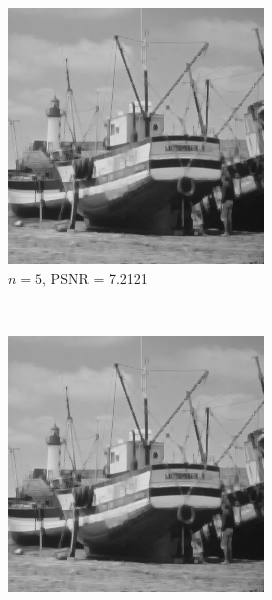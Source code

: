 \documentclass{article}
\begin{document}
\begin{enumerate}[label=(\alph*)]
\begin{figure}[!htb]
        \begin{subfigure}[b]{0.3\textwidth}
            \includegraphics[width=\textwidth]{img/RSC5.png}
            \caption{$n = 5$, PSNR = 7.2121}
        \end{subfigure}
        ~
        \begin{subfigure}[b]{0.3\textwidth}
            \includegraphics[width=\textwidth]{img/RSC7.png}

\end{subfigure}
\end{figure}
\end{enumerate}
\end{document}
